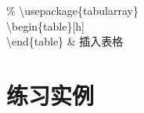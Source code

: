 \documentclass{ctexart}
\begin{document}
\begin{longtblr}[
      label = none,
      entry = none,
    ]
    {\% \textbackslash{}usepackage\{tabularray\}\\\textbackslash{}begin\{table\}{[}h]\\\textbackslash{}end\{table\}\textcolor[rgb]{0.2,0.2,0.2}{}}                                                                                                                                                                                                                                                                                                                                                                                                                                                                                                                                                                                                                                                                                                                                             & 插入表格                                 
    \end{longtblr}
    
\section{练习实例}
\end{document}
